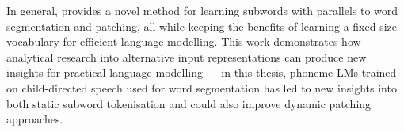 In general, \bytespan provides a novel method for learning subwords with parallels to word segmentation and patching, all while keeping the benefits of learning a fixed-size vocabulary for efficient language modelling. This work demonstrates how analytical research into alternative input representations can produce new insights for practical language modelling --- in this thesis, phoneme LMs trained on child-directed speech used for word segmentation has led to new insights into both static subword tokenisation and could also improve dynamic patching approaches. 







